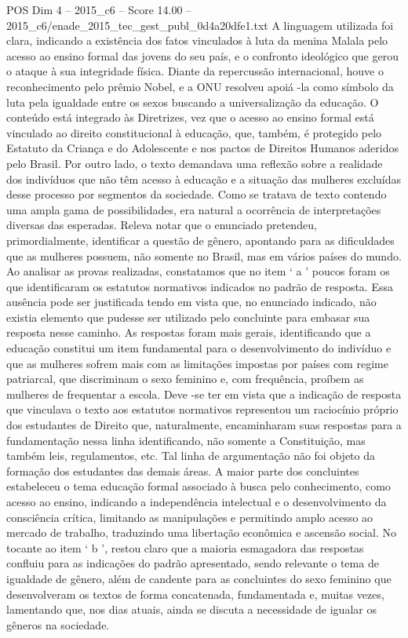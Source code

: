 \begin{textsample}{POS Dim 4 – 2015\_c6 – Score 14.00 – 2015\_c6/enade\_2015\_tec\_gest\_publ\_0d4a20dfe1.txt}
A linguagem utilizada foi clara, indicando a existência dos fatos vinculados à luta da menina Malala pelo acesso ao ensino formal das jovens do seu país, e o confronto ideológico que gerou o ataque à sua integridade física.
Diante da repercussão internacional, houve o reconhecimento pelo prêmio Nobel, e a ONU resolveu apoiá -la como símbolo da luta pela igualdade entre os sexos buscando a universalização da educação.
O conteúdo está integrado às Diretrizes, vez que o acesso ao ensino formal está vinculado ao direito constitucional à educação, que, também, é protegido pelo Estatuto da Criança e do Adolescente e nos pactos de Direitos Humanos aderidos pelo Brasil.
Por outro lado, o texto demandava uma reflexão sobre a realidade dos indivíduos que não têm acesso à educação e a situação das mulheres excluídas desse processo por segmentos da sociedade.
Como se tratava de texto contendo uma ampla gama de possibilidades, era natural a ocorrência de interpretações diversas das esperadas.
Releva notar que o enunciado pretendeu, primordialmente, identificar a questão de gênero, apontando para as dificuldades que as mulheres possuem, não somente no Brasil, mas em vários países do mundo.
Ao analisar as provas realizadas, constatamos que no item ‘ a ’ poucos foram os que identificaram os estatutos normativos indicados no padrão de resposta.
Essa ausência pode ser justificada tendo em vista que, no enunciado indicado, não existia elemento que pudesse ser utilizado pelo concluinte para embasar sua resposta nesse caminho.
As respostas foram mais gerais, identificando que a educação constitui um item fundamental para o desenvolvimento do indivíduo e que as mulheres sofrem mais com as limitações impostas por países com regime patriarcal, que discriminam o sexo feminino e, com frequência, proíbem as mulheres de frequentar a escola.
Deve -se ter em vista que a indicação de resposta que vinculava o texto aos estatutos normativos representou um raciocínio próprio dos estudantes de Direito que, naturalmente, encaminharam suas respostas para a fundamentação nessa linha identificando, não somente a Constituição, mas também leis, regulamentos, etc.
Tal linha de argumentação não foi objeto da formação dos estudantes das demais áreas.
A maior parte dos concluintes estabeleceu o tema educação formal associado à busca pelo conhecimento, como acesso ao ensino, indicando a independência intelectual e o desenvolvimento da consciência crítica, limitando as manipulações e permitindo amplo acesso ao mercado de trabalho, traduzindo uma libertação econômica e ascensão social.
No tocante ao item ‘ b ’, restou claro que a maioria esmagadora das respostas confluiu para as indicações do padrão apresentado, sendo relevante o tema de igualdade de gênero, além de candente para as concluintes do sexo feminino que desenvolveram os textos de forma concatenada, fundamentada e, muitas vezes, lamentando que, nos dias atuais, ainda se discuta a necessidade de igualar os gêneros na sociedade.

\end{textsample}
